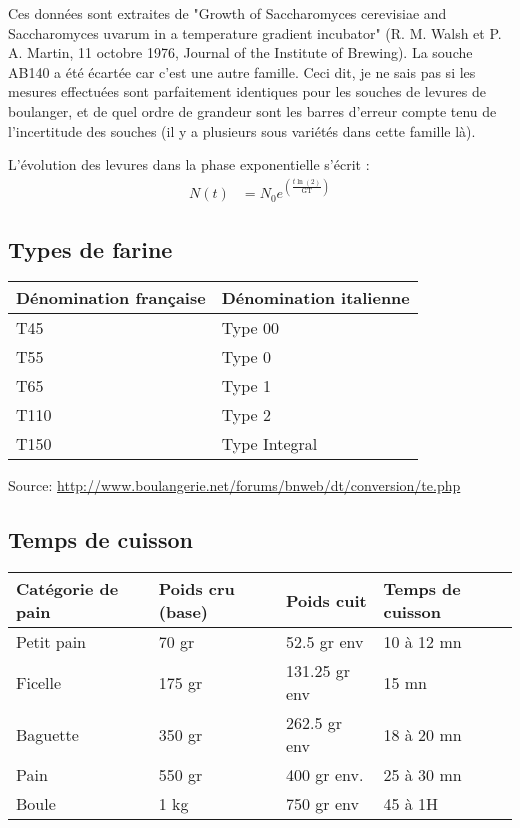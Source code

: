 \documentclass[a4paper,twoside,openright]{report}
\begin{document}
Ces données sont extraites de "Growth of Saccharomyces cerevisiae and Saccharomyces uvarum in a temperature gradient incubator" (R. M. Walsh et P. A. Martin, 11 octobre 1976, Journal of the Institute of Brewing). La souche AB140 a été écartée car c'est une autre famille. Ceci dit, je ne sais pas si les mesures effectuées sont parfaitement identiques pour les souches de levures de boulanger, et de quel ordre de grandeur sont les barres d'erreur compte tenu de l'incertitude des souches (il y a plusieurs sous variétés dans cette famille là).

L'évolution des levures dans la phase exponentielle s'écrit :
\begin{align}
N(t) &= N_0 e^{\left(\frac{t\ln(2)}{\mathrm{GT}}\right)}
\end{align}

\subsection{Types de farine}

\begin{center}
\begin{tabular}{|l|l|}\hline
Dénomination française & Dénomination italienne\\\hline
T45      &  Type 00   \\\hline
T55      &  Type 0       \\\hline
T65      &  Type 1      \\\hline
T110     &  Type 2           \\\hline
T150     &  Type Integral         \\\hline
\end{tabular}
\end{center}

Source: \url{http://www.boulangerie.net/forums/bnweb/dt/conversion/te.php}

\subsection{Temps de cuisson}
\begin{center}
\begin{tabular}{|l|l|l|l|}\hline
Catégorie de pain & Poids cru (base) & Poids cuit     &  Temps de cuisson \\\hline
Petit pain        & 70 gr            & 52.5 gr env    &  10 à 12 mn       \\\hline
Ficelle           & 175 gr           & 131.25 gr env  &  15 mn            \\\hline
Baguette          & 350 gr           & 262.5 gr env   &  18 à 20 mn       \\\hline
Pain              & 550 gr           & 400 gr env.    &  25 à 30 mn       \\\hline
Boule             & 1 kg             & 750 gr env     &  45 à 1H          \\\hline
\end{tabular}\end{center}
\end{document}
